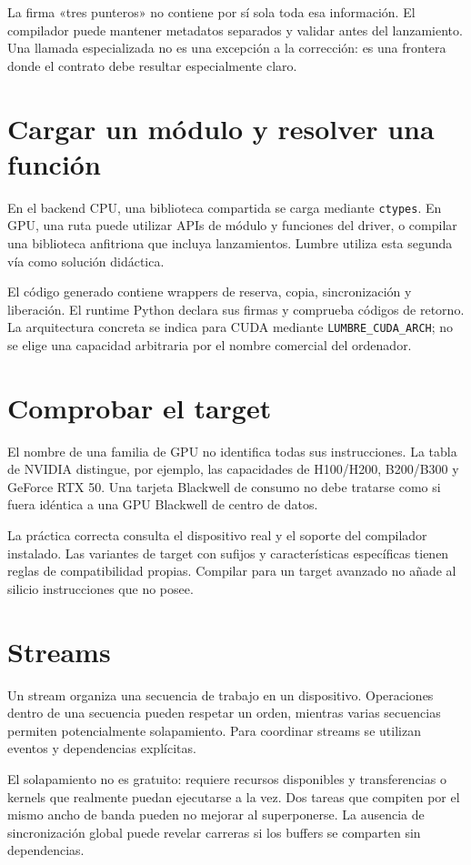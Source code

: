 \documentclass[12pt,a4paper,oneside]{report}
\begin{document}
La firma «tres punteros» no contiene por sí sola toda esa información. El compilador puede mantener metadatos separados y validar antes del lanzamiento. Una llamada especializada no es una excepción a la corrección: es una frontera donde el contrato debe resultar especialmente claro.

\section{Cargar un módulo y resolver una función}
En el backend CPU, una biblioteca compartida se carga mediante \texttt{ctypes}. En GPU, una ruta puede utilizar APIs de módulo y funciones del driver, o compilar una biblioteca anfitriona que incluya lanzamientos. Lumbre utiliza esta segunda vía como solución didáctica.

El código generado contiene wrappers de reserva, copia, sincronización y liberación. El runtime Python declara sus firmas y comprueba códigos de retorno. La arquitectura concreta se indica para CUDA mediante \texttt{LUMBRE\_CUDA\_ARCH}; no se elige una capacidad arbitraria por el nombre comercial del ordenador.

\section{Comprobar el target}
El nombre de una familia de GPU no identifica todas sus instrucciones. La tabla de NVIDIA distingue, por ejemplo, las capacidades de H100/H200, B200/B300 y GeForce RTX 50. Una tarjeta Blackwell de consumo no debe tratarse como si fuera idéntica a una GPU Blackwell de centro de datos. \cite{cuda-gpus}

La práctica correcta consulta el dispositivo real y el soporte del compilador instalado. Las variantes de target con sufijos y características específicas tienen reglas de compatibilidad propias. Compilar para un target avanzado no añade al silicio instrucciones que no posee.

\section{Streams}
Un stream organiza una secuencia de trabajo en un dispositivo. Operaciones dentro de una secuencia pueden respetar un orden, mientras varias secuencias permiten potencialmente solapamiento. Para coordinar streams se utilizan eventos y dependencias explícitas.

El solapamiento no es gratuito: requiere recursos disponibles y transferencias o kernels que realmente puedan ejecutarse a la vez. Dos tareas que compiten por el mismo ancho de banda pueden no mejorar al superponerse. La ausencia de sincronización global puede revelar carreras si los buffers se comparten sin dependencias.
\end{document}

